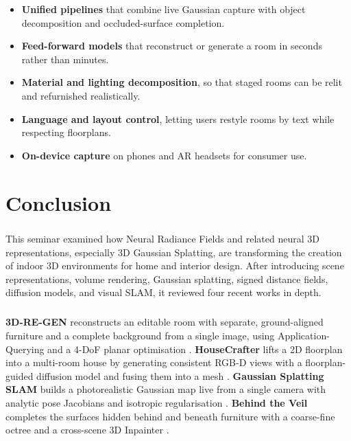 \documentclass[12pt,a4paper,final]{extreport}
\begin{document}
\begin{itemize}
  \item \textbf{Unified pipelines} that combine live Gaussian capture with object decomposition and occluded-surface completion.
  \item \textbf{Feed-forward models} that reconstruct or generate a room in seconds rather than minutes.
  \item \textbf{Material and lighting decomposition}, so that staged rooms can be relit and refurnished realistically.
  \item \textbf{Language and layout control}, letting users restyle rooms by text while respecting floorplans.
  \item \textbf{On-device capture} on phones and AR headsets for consumer use.
\end{itemize}

\chapter{Conclusion}

\paragraph{} This seminar examined how Neural Radiance Fields and related neural 3D representations, especially 3D Gaussian Splatting, are transforming the creation of indoor 3D environments for home and interior design. After introducing scene representations, volume rendering, Gaussian splatting, signed distance fields, diffusion models, and visual SLAM, it reviewed four recent works in depth.

\paragraph{} \textbf{3D-RE-GEN} reconstructs an editable room with separate, ground-aligned furniture and a complete background from a single image, using Application-Querying and a 4-DoF planar optimisation \cite{p1}. \textbf{HouseCrafter} lifts a 2D floorplan into a multi-room house by generating consistent RGB-D views with a floorplan-guided diffusion model and fusing them into a mesh \cite{p2}. \textbf{Gaussian Splatting SLAM} builds a photorealistic Gaussian map live from a single camera with analytic pose Jacobians and isotropic regularisation \cite{p3}. \textbf{Behind the Veil} completes the surfaces hidden behind and beneath furniture with a coarse-fine octree and a cross-scene 3D Inpainter \cite{p4}.
\end{document}
